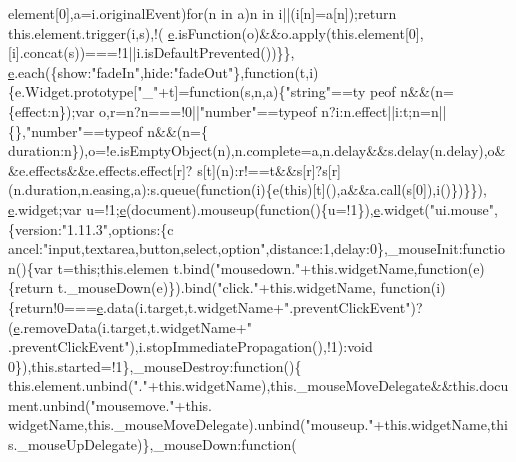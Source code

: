 \begin{DoxyCode}
      element[0],a=i.originalEvent)\textcolor{keywordflow}{for}(n in a)n in i||(i[n]=a[n]);\textcolor{keywordflow}{return} this.element.trigger(i,s),!(
      \hyperlink{jquery-ui_8min_8js_a2c038346d47955cbe2cb91e338edd7e1}{e}.isFunction(o)&&o.apply(this.element[0],[i].concat(s))===!1||i.isDefaultPrevented())\}\},
      \hyperlink{jquery-ui_8min_8js_a2c038346d47955cbe2cb91e338edd7e1}{e}.each(\{show:\textcolor{stringliteral}{"fadeIn"},hide:\textcolor{stringliteral}{"fadeOut"}\},\textcolor{keyword}{function}(t,i)\{e.Widget.prototype[\textcolor{stringliteral}{"\_"}+t]=function(s,n,a)\{\textcolor{stringliteral}{"string"}==ty
      peof n&&(n=\{effect:n\});var o,r=n?n===!0||\textcolor{stringliteral}{"number"}==typeof n?i:n.effect||i:t;n=n||\{\},\textcolor{stringliteral}{"number"}==typeof n&&(n=\{
      duration:n\}),o=!e.isEmptyObject(n),n.complete=a,n.delay&&s.delay(n.delay),o&&e.effects&&e.effects.effect[r]?
      s[t](n):r!==t&&s[r]?s[r](n.duration,n.easing,a):s.queue(function(i)\{e(this)[t](),a&&a.call(s[0]),i()\})\}\}),
      \hyperlink{jquery-ui_8min_8js_a2c038346d47955cbe2cb91e338edd7e1}{e}.widget;var u=!1;\hyperlink{jquery-ui_8min_8js_a2c038346d47955cbe2cb91e338edd7e1}{e}(document).mouseup(\textcolor{keyword}{function}()\{u=!1\}),\hyperlink{jquery-ui_8min_8js_a2c038346d47955cbe2cb91e338edd7e1}{e}.widget(\textcolor{stringliteral}{"ui.mouse"},\{version:\textcolor{stringliteral}{"1.11.3"},options:\{c
      ancel:\textcolor{stringliteral}{"input,textarea,button,select,option"},distance:1,delay:0\},\_mouseInit:\textcolor{keyword}{function}()\{var t=this;this.elemen
      t.bind(\textcolor{stringliteral}{"mousedown."}+this.widgetName,function(e)\{return t.\_mouseDown(e)\}).bind(\textcolor{stringliteral}{"click."}+this.widgetName,\textcolor{keyword}{
      function}(i)\{\textcolor{keywordflow}{return}!0===\hyperlink{jquery-ui_8min_8js_a2c038346d47955cbe2cb91e338edd7e1}{e}.data(i.target,t.widgetName+\textcolor{stringliteral}{".preventClickEvent"})?(\hyperlink{jquery-ui_8min_8js_a2c038346d47955cbe2cb91e338edd7e1}{e}.removeData(i.target,t.widgetName+\textcolor{stringliteral}{"
      .preventClickEvent"}),i.stopImmediatePropagation(),!1):\textcolor{keywordtype}{void} 0\}),this.started=!1\},\_mouseDestroy:\textcolor{keyword}{function}()\{
      this.element.unbind(\textcolor{stringliteral}{"."}+this.widgetName),this.\_mouseMoveDelegate&&this.document.unbind(\textcolor{stringliteral}{"mousemove."}+this.
      widgetName,this.\_mouseMoveDelegate).unbind(\textcolor{stringliteral}{"mouseup."}+this.widgetName,this.\_mouseUpDelegate)\},\_mouseDown:\textcolor{keyword}{function}(

\end{DoxyCode}
